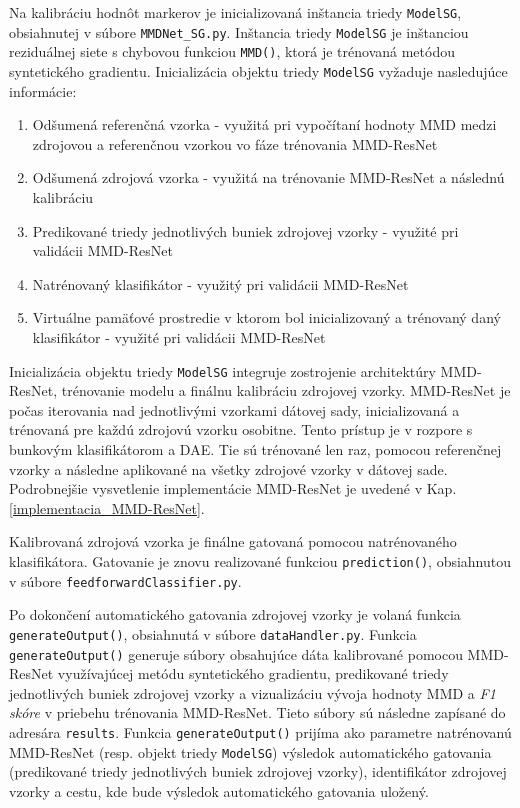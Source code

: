 Na kalibráciu hodnôt markerov je inicializovaná inštancia triedy \texttt{ModelSG}, obsiahnutej v súbore \texttt{MMDNet_SG.py}. Inštancia triedy \texttt{ModelSG} je inštanciou reziduálnej siete s chybovou funkciou \texttt{MMD()}, ktorá je trénovaná metódou syntetického gradientu. Inicializácia objektu triedy \texttt{ModelSG} vyžaduje nasledujúce informácie:
\begin{enumerate}
    \item Odšumená referenčná vzorka - využitá pri vypočítaní hodnoty MMD medzi zdrojovou a referenčnou vzorkou vo fáze trénovania MMD-ResNet
    \item Odšumená zdrojová vzorka - využitá na trénovanie MMD-ResNet a následnú kalibráciu
    \item Predikované triedy jednotlivých buniek zdrojovej vzorky - využité pri validácii MMD-ResNet
    \item Natrénovaný klasifikátor - využitý pri validácii MMD-ResNet
    \item Virtuálne pamäťové prostredie v ktorom bol inicializovaný a trénovaný daný klasifikátor - využité pri validácii MMD-ResNet
\end{enumerate}
Inicializácia objektu triedy \texttt{ModelSG} integruje zostrojenie architektúry MMD-ResNet, trénovanie modelu a finálnu kalibráciu zdrojovej vzorky. MMD-ResNet je počas iterovania nad jednotlivými vzorkami dátovej sady, inicializovaná a trénovaná pre každú zdrojovú vzorku osobitne. Tento prístup je v rozpore s bunkovým klasifikátorom a DAE. Tie sú trénované len raz, pomocou referenčnej vzorky a následne aplikované na všetky zdrojové vzorky v dátovej sade. Podrobnejšie vysvetlenie implementácie MMD-ResNet je uvedené v Kap. \ref{implementacia_MMD-ResNet}.

Kalibrovaná zdrojová vzorka je finálne gatovaná pomocou natrénovaného klasifikátora. Gatovanie je znovu realizované funkciou \texttt{prediction()}, obsiahnutou v súbore \texttt{feedforwardClassifier.py}.

\begin{sloppypar}
Po dokončení automatického gatovania zdrojovej vzorky je volaná funkcia \texttt{generateOutput()}, obsiahnutá v súbore \texttt{dataHandler.py}. Funkcia \texttt{generateOutput()} generuje súbory obsahujúce dáta kalibrované pomocou MMD-ResNet využívajúcej metódu syntetického gradientu, predikované triedy jednotlivých buniek zdrojovej vzorky a vizualizáciu vývoja hodnoty MMD a \textit{F1 skóre} v priebehu trénovania MMD-ResNet. Tieto súbory sú následne zapísané do adresára \texttt{results}. Funkcia \texttt{generateOutput()} prijíma ako parametre natrénovanú MMD-ResNet (resp. objekt triedy \texttt{ModelSG}) výsledok automatického gatovania (predikované triedy jednotlivých buniek zdrojovej vzorky), identifikátor zdrojovej vzorky a cestu, kde bude výsledok automatického gatovania uložený.
\end{sloppypar}

